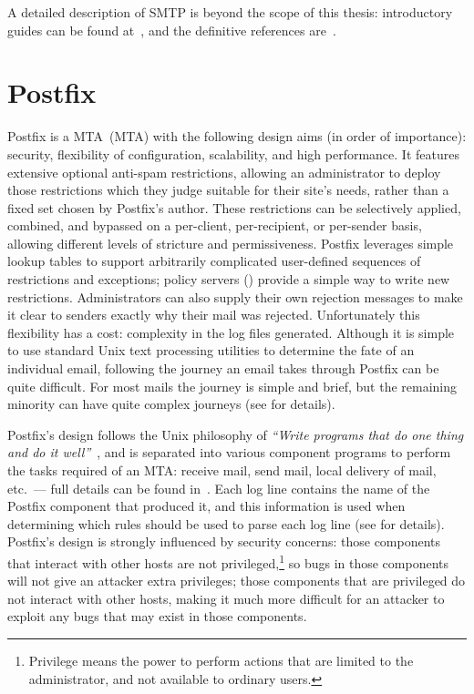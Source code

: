 A detailed description of \gls{SMTP} is beyond the scope of this thesis:
introductory guides can be found at~\cite{smtp-intro-01,smtp-intro-02},
and the definitive references are~\cite{RFC821,RFC2821}.

\section{Postfix}

\label{postfix background}

Postfix is a \acrlong{MTA}~(\gls{MTA}) with the following design aims (in
order of importance): security, flexibility of configuration, scalability,
and high performance.  It features extensive optional anti-spam
restrictions, allowing an administrator to deploy those restrictions which
they judge suitable for their site's needs, rather than a fixed set chosen
by Postfix's author.  These restrictions can be selectively applied,
combined, and bypassed on a per-client, per-recipient, or per-sender basis,
allowing different levels of stricture and permissiveness.  Postfix
leverages simple lookup tables to support arbitrarily complicated
user-defined sequences of restrictions and exceptions; policy servers
() provide a simple way to write new
restrictions.  Administrators can also supply their own rejection messages
to make it clear to senders exactly why their mail was rejected.
Unfortunately this flexibility has a cost: complexity in the log files
generated.  Although it is simple to use standard Unix text processing
utilities to determine the fate of an individual email, following the
journey an email takes through Postfix can be quite difficult.  For most
mails the journey is simple and brief, but the remaining minority can have
quite complex journeys (see  for details).

Postfix's design follows the Unix philosophy of \textit{``Write programs
that do one thing and do it well''\/}~\cite{unix-philosophy}, and is
separated into various component programs to perform the tasks required of
an \gls{MTA}\@: receive mail, send mail, local delivery of mail, etc.\ ---
full details can be found in~\cite{postfix-overview}.  Each log line
contains the name of the Postfix component that produced it, and this
information is used when determining which rules should be used to parse
each log line (see  for details).
Postfix's design is strongly influenced by security concerns: those
components that interact with other hosts are not
privileged,\footnote{Privilege means the power to perform actions that are
limited to the administrator, and not available to ordinary users.} so bugs
in those components will not give an attacker extra privileges; those
components that are privileged do not interact with other hosts, making it
much more difficult for an attacker to exploit any bugs that may exist in
those components.

